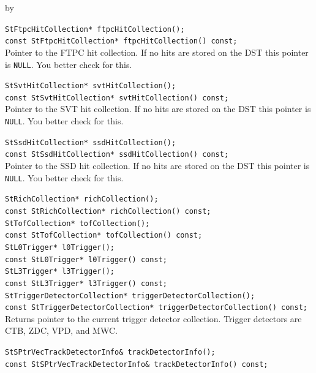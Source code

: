 \documentclass[twoside]{article}
\newcommand{\entrylabel}[1]{\mbox{\textbf{{#1}}}\hfil}%
\newenvironment{entry}
{\begin{list}{}%
    {\renewcommand{\makelabel}{\entrylabel}%
     \setlength{\labelwidth}{90pt}%
     \setlength{\leftmargin}{\labelwidth}
     \advance\leftmargin by \labelsep%
      }%
    }%
  {\end{list}}
\newcommand{\Entrylabel}[1]%
{\raisebox{0pt}[1ex][0pt]{\makebox[\labelwidth][l]%
    {\parbox[t]{\labelwidth}{\hspace{0pt}\textbf{{#1}}}}}}
\newenvironment{Entry}%
{\renewcommand{\entrylabel}{\Entrylabel}\begin{entry}}%
  {\end{entry}}
\begin{document}
\begin{Entry}
    \verb+StFtpcHitCollection* ftpcHitCollection();+\\
    \verb+const StFtpcHitCollection* ftpcHitCollection() const;+\\
    Pointer to the FTPC hit collection. If no hits are stored on the
    DST this pointer is \texttt{NULL}. You better check for this.

    \verb+StSvtHitCollection* svtHitCollection();+\\
    \verb+const StSvtHitCollection* svtHitCollection() const;+\\
    Pointer to the SVT hit collection. If no hits are stored on the
    DST this pointer is \texttt{NULL}. You better check for this.    

    \verb+StSsdHitCollection* ssdHitCollection();+\\
    \verb+const StSsdHitCollection* ssdHitCollection() const;+\\
    Pointer to the SSD hit collection. If no hits are stored on the
    DST this pointer is \texttt{NULL}. You better check for this.   

    \verb+StRichCollection* richCollection();+\\
    \verb+const StRichCollection* richCollection() const;+\\

    \verb+StTofCollection* tofCollection();+\\
    \verb+const StTofCollection* tofCollection() const;+\\

    \verb+StL0Trigger* l0Trigger();+\\
    \verb+const StL0Trigger* l0Trigger() const;+\\

    \verb+StL3Trigger* l3Trigger();+\\
    \verb+const StL3Trigger* l3Trigger() const;+\\

    \verb+StTriggerDetectorCollection* triggerDetectorCollection();+\\
    \verb+const StTriggerDetectorCollection* triggerDetectorCollection() const;+\\
    Returns pointer to the current trigger detector collection.
    Trigger detectors are CTB, ZDC, VPD, and MWC.
    
    \verb+StSPtrVecTrackDetectorInfo& trackDetectorInfo();+\\
    \verb+const StSPtrVecTrackDetectorInfo& trackDetectorInfo() const;+\\
    

\end{Entry}
\end{document}
